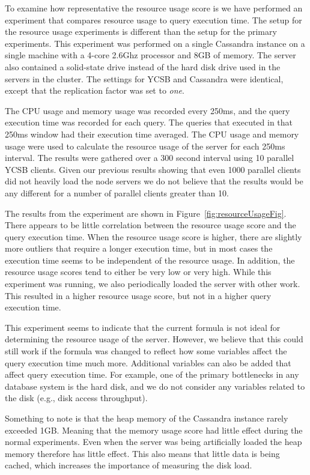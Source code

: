 To examine how representative the resource usage score is we have performed an experiment that compares resource usage to query execution time. The setup for the resource usage experiments is different than the setup for the primary experiments. This experiment was performed on a single Cassandra instance on a single machine with a 4-core 2.6Ghz processor and 8GB of memory. The server also contained a solid-state drive instead of the hard disk drive used in the servers in the cluster. The settings for YCSB and Cassandra were identical, except that the replication factor was set to \textit{one}.

The CPU usage and memory usage was recorded every 250ms, and the query execution time was recorded for each query. The queries that executed in that 250ms window had their execution time averaged. The CPU usage and memory usage were used to calculate the resource usage of the server for each 250ms interval. The results were gathered over a 300 second interval using 10 parallel YCSB clients. Given our previous results showing that even 1000 parallel clients did not heavily load the node servers we do not believe that the results would be any different for a number of parallel clients greater than 10.

The results from the experiment are shown in Figure~\ref{fig:resourceUsageFig}. There appears to be little correlation between the resource usage score and the query execution time. When the resource usage score is higher, there are slightly more outliers that require a longer execution time, but in most cases the execution time seems to be independent of the resource usage. In addition, the resource usage scores tend to either be very low or very high. While this experiment was running, we also periodically loaded the server with other work. This resulted in a higher resource usage score, but not in a higher query execution time.

This experiment seems to indicate that the current formula is not ideal for determining the resource usage of the server. However, we believe that this could still work if the formula was changed to reflect how some variables affect the query execution time much more.  Additional variables can also be added that affect query execution time. For example, one of the primary bottlenecks in any database system is the hard disk, and we do not consider any variables related to the disk (e.g., disk access throughput).

Something to note is that the heap memory of the Cassandra instance rarely exceeded 1GB. Meaning that the memory usage score had little effect during the normal experiments. Even when the server was being artificially loaded the heap memory therefore has little effect. This also means that little data is being cached, which increases the importance of measuring the disk load.


